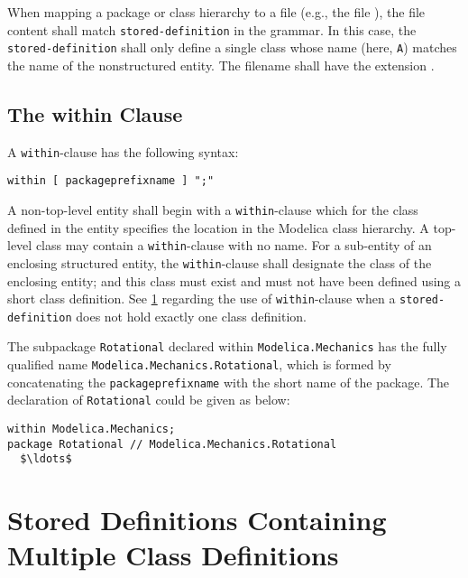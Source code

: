 When mapping a package or class hierarchy to a file (e.g., the file ), the file content shall match \lstinline[language=grammar]!stored-definition! in the grammar.
In this case, the \lstinline[language=grammar]!stored-definition! shall only define a single class whose name (here, \lstinline!A!) matches the name of the nonstructured entity.
The filename shall have the extension .


\subsection{The within Clause}\label{the-within-clause}

A \lstinline!within!-clause has the following syntax:
\begin{lstlisting}[language=grammar]
  within [ packageprefixname ] ";"
\end{lstlisting}%
A non-top-level entity shall begin with a \lstinline!within!-clause which for the class defined in the entity specifies the location in the Modelica class hierarchy.
A top-level class may contain a \lstinline!within!-clause with no name.
For a sub-entity of an enclosing structured entity, the \lstinline!within!-clause shall designate the class of the enclosing entity; and this class must exist and must not have been defined using a short class definition.
See \cref{stored-definitions-containing-multiple-class-definitions} regarding the use of \lstinline!within!-clause when a \lstinline[language=grammar]!stored-definition! does not hold exactly one class definition.

\begin{example}
The subpackage \lstinline!Rotational! declared within \lstinline!Modelica.Mechanics! has the fully qualified name \lstinline!Modelica.Mechanics.Rotational!, which is formed by concatenating the \lstinline[language=grammar]!packageprefixname! with the short name of the package.
The declaration of \lstinline!Rotational! could be given as below:
\begin{lstlisting}[language=modelica]
within Modelica.Mechanics;
package Rotational // Modelica.Mechanics.Rotational
  $\ldots$
\end{lstlisting}
\end{example}


\section{Stored Definitions Containing Multiple Class Definitions}\label{stored-definitions-containing-multiple-class-definitions}

